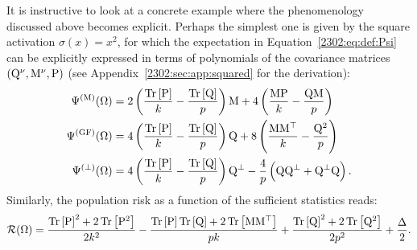 It is instructive to look at a concrete example where the phenomenology discussed above becomes explicit. Perhaps the simplest one  is given by the square activation $\sigma(x)=x^2$, for which the expectation in Equation~\eqref{2302:eq:def:Psi} can be explicitly expressed in terms of polynomials of the covariance matrices $(\mathrm{Q}^{\nu},\mathrm{M}^{\nu}, \mathrm{P})$ (see Appendix~\ref{2302:sec:app:squared} for the derivation):
\begin{equation}
\label{2302:eq:squared_ODE}
\begin{split}
    \Psi^{(\mathrm{M})}(\Omega)   &= 2\left(\frac{\Tr{\P}}k - \frac{\Tr{\Q}}p\right)\M +
        4\left(\frac{\M\P}{k} - \frac{\Q\M}{p}\right) \\
    \Psi^{(\mathrm{GF})}(\Omega)  &= 4\left(\frac{\Tr{\P}}k - \frac{\Tr{\Q}}p\right)\Q +
        8\left(\frac{\M\M^\top}{k} - \frac{\Q^2}{p}\right) \\
    \Psi^{(\mathrm{\bot})}(\Omega) &= 4\left(\frac{\Tr{\P}}k-\frac{\Tr{\Q}}{p}\right) \Q^\bot - \frac{4}{p}\left(\Q\Q^\bot+\Q^\bot\Q\right).
\end{split}
\end{equation}
Similarly, the population risk as a function of the sufficient statistics reads:
\begin{equation} \label{2302:eq:risk_quadratic}\begin{split}
  \mathcal{R}(\Omega)
       =  \frac{\Tr{\P}^2+2\Tr{\P^2}}{2k^2}
           - \frac{\Tr{\P}\Tr{\Q}+2\Tr{\M\M^\top}}{pk}
           + \frac{\Tr{\Q}^2+2\Tr{\Q^2}}{2p^2}
           + \frac\Delta2.
\end{split}\end{equation}

